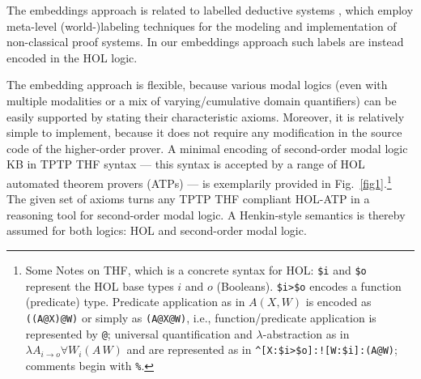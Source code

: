 \documentclass{llncs}
\begin{document}
The embeddings approach is related to labelled deductive systems
\cite{gabbay96}, which employ meta-level (world-)labeling techniques
for the modeling and implementation of non-classical proof systems. In
our embeddings approach such labels are instead encoded in the HOL
logic. 

The embedding approach is flexible, because various modal logics (even
with multiple modalities or a mix of varying/cumulative domain
quantifiers) can be easily supported by stating their characteristic
axioms. Moreover, it is relatively simple to implement, because it
does not require any modification in the source code of the
higher-order prover. A minimal encoding of
second-order modal logic KB in TPTP THF syntax \cite{J22} --- this syntax is
accepted by a range of HOL automated theorem provers (ATPs) --- is
exemplarily provided in Fig.~\ref{fig1}.\footnote{Some Notes on THF, which is a concrete syntax for HOL: \texttt{\$i} and
                   \texttt{\$o} represent the HOL base types $i$ and
                   $o$ (Booleans). \texttt{\$i>\$o} encodes a function
                   (predicate) type.  Predicate
                   application as in $A(X,W)$ is encoded as
                   \texttt{((A@X)@W)} or simply as
                   \texttt{(A@X@W)}, i.e., function/predicate application
                   is represented by \texttt{@}; universal
                   quantification and $\lambda$-abstraction as in
                   $\lambda {A}_{i\rightarrow o} \forall {W_i} (A\,W)$
                   and are represented as in
                   \texttt{\^{}[X:\$i>\$o]:![W:\$i]:(A@W)}; comments begin with
                   \texttt{\%}.} The given set of axioms turns
any TPTP THF compliant HOL-ATP in a reasoning tool for second-order modal logic. A
Henkin-style semantics is thereby assumed for both logics: HOL and
second-order modal logic.
\end{document}
